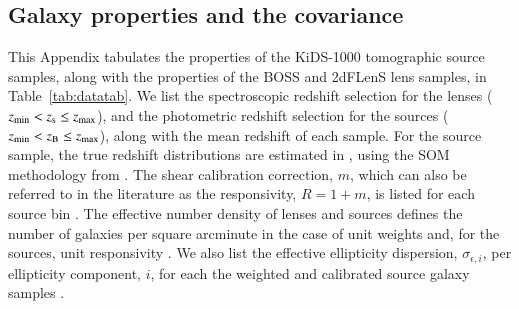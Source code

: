 \begin{appendix} 
\section{Galaxy properties and the \tttp covariance}
\label{app:properties}

This Appendix tabulates the properties of the KiDS-1000 tomographic source samples, along with the properties of the BOSS and 2dFLenS lens samples, in Table~\ref{tab:datatab}.   
We list the spectroscopic redshift selection for the lenses ($z_{\rm min} < z_{\rm s} \leq z_{\rm max}$), and the photometric redshift selection for the sources ($z_{\rm min} < z_{\rm B} \leq z_{\rm max}$), along with the mean redshift of each sample.  
For the source sample, the true redshift distributions are estimated in \citet{hildebrandt/etal:inprep}, using the SOM methodology from \citet{wright/etal:2020}.     
The shear calibration correction, $m$, which can also be referred to in the literature as the responsivity, $R = 1+m$, is listed for each source bin \citep{kannawadi/etal:2019}.  
The effective number density of lenses and sources defines the number of galaxies per square arcminute in the case of unit weights and, for the sources, unit responsivity \citep[see equations C.11 and C.13 in][]{joachimi/etal:inprep}.  
We also list the effective ellipticity dispersion, $\sigma_{\epsilon,i}$, per ellipticity component, $i$, for each the weighted and calibrated source galaxy samples \citep[equation C.8 in][]{joachimi/etal:inprep}.


\end{appendix}

